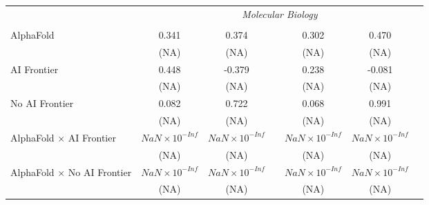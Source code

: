 \begin{tabular}{lcccccc}
 & \multicolumn{6}{c}{\textit{Molecular Biology}} \\ \\
   AlphaFold                                                                  & 0.341                  & 0.374                  &                        & 0.302                  & 0.470                  &   \\   
                                                                              & (NA)                   & (NA)                   &                        & (NA)                   & (NA)                   &   \\   
   AI Frontier                                                                & 0.448                  & -0.379                 &                        & 0.238                  & -0.081                 &   \\   
                                                                              & (NA)                   & (NA)                   &                        & (NA)                   & (NA)                   &   \\   
   No AI Frontier                                                             & 0.082                  & 0.722                  &                        & 0.068                  & 0.991                  &   \\   
                                                                              & (NA)                   & (NA)                   &                        & (NA)                   & (NA)                   &   \\   
   AlphaFold $\times$ AI Frontier                                             & $NaN\times 10^{-Inf}$  & $NaN\times 10^{-Inf}$  &                        & $NaN\times 10^{-Inf}$  & $NaN\times 10^{-Inf}$  &   \\   
                                                                              & (NA)                   & (NA)                   &                        & (NA)                   & (NA)                   &   \\   
   AlphaFold $\times$ No AI Frontier                                          & $NaN\times 10^{-Inf}$  & $NaN\times 10^{-Inf}$  &                        & $NaN\times 10^{-Inf}$  & $NaN\times 10^{-Inf}$  &   \\   
                                                                              & (NA)                   & (NA)                   &                        & (NA)                   & (NA)                   &   \\   

\end{tabular}
